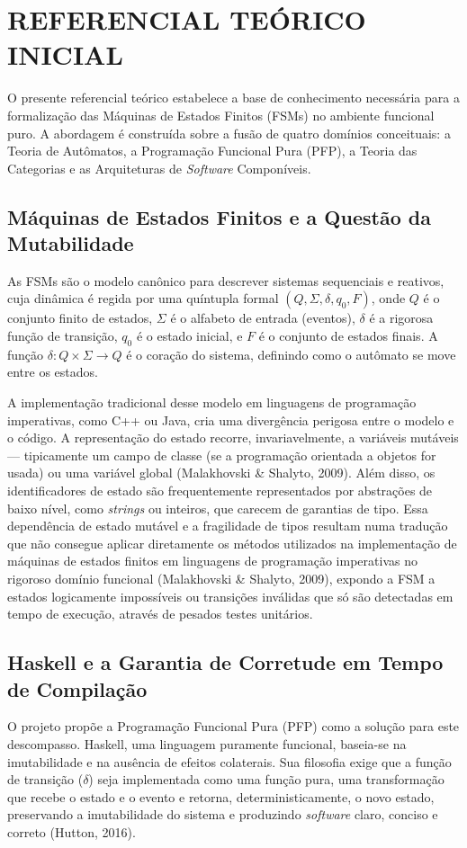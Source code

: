 \documentclass[12pt,a4paper]{article}
\begin{document}
\section{REFERENCIAL TEÓRICO INICIAL}
O presente referencial teórico estabelece a base de conhecimento necessária para a formalização das Máquinas de Estados Finitos (FSMs) no ambiente funcional puro. A abordagem é construída sobre a fusão de quatro domínios conceituais: a Teoria de Autômatos, a Programação Funcional Pura (PFP), a Teoria das Categorias e as Arquiteturas de \textit{Software} Componíveis.

\subsection{Máquinas de Estados Finitos e a Questão da Mutabilidade}

As FSMs são o modelo canônico para descrever sistemas sequenciais e reativos, cuja dinâmica é regida por uma quíntupla formal $(Q, \Sigma, \delta, q_0, F)$, onde $Q$ é o conjunto finito de estados, $\Sigma$ é o alfabeto de entrada (eventos), $\delta$ é a rigorosa função de transição, $q_0$ é o estado inicial, e $F$ é o conjunto de estados finais. A função $\delta: Q \times \Sigma \to Q$ é o coração do sistema, definindo como o autômato se move entre os estados.

A implementação tradicional desse modelo em linguagens de programação imperativas, como C++ ou Java, cria uma divergência perigosa entre o modelo e o código. A representação do estado recorre, invariavelmente, a variáveis mutáveis --- tipicamente um campo de classe (se a programação orientada a objetos for usada) ou uma variável global (Malakhovski \& Shalyto, 2009). Além disso, os identificadores de estado são frequentemente representados por abstrações de baixo nível, como \textit{strings} ou inteiros, que carecem de garantias de tipo. Essa dependência de estado mutável e a fragilidade de tipos resultam numa tradução que não consegue aplicar diretamente os métodos utilizados na implementação de máquinas de estados finitos em linguagens de programação imperativas no rigoroso domínio funcional (Malakhovski \& Shalyto, 2009), expondo a FSM a estados logicamente impossíveis ou transições inválidas que só são detectadas em tempo de execução, através de pesados testes unitários.

\subsection{Haskell e a Garantia de Corretude em Tempo de Compilação}
O projeto propõe a Programação Funcional Pura (PFP) como a solução para este descompasso. Haskell, uma linguagem puramente funcional, baseia-se na imutabilidade e na ausência de efeitos colaterais. Sua filosofia exige que a função de transição ($\delta$) seja implementada como uma função pura, uma transformação que recebe o estado e o evento e retorna, deterministicamente, o novo estado, preservando a imutabilidade do sistema e produzindo \textit{software} claro, conciso e correto (Hutton, 2016).
\end{document}
